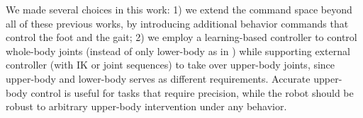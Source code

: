 We made several choices in this work: 1) we extend the command space beyond all of these previous works, by introducing additional behavior commands that control the foot and the gait; 2) we employ a learning-based controller to control whole-body joints (instead of only lower-body as in \citeauthor{lu2024pmp}) while supporting external controller (with IK or joint sequences) to take over upper-body joints, since upper-body and lower-body serves as different requirements. Accurate upper-body control is useful for tasks that require precision, while the robot should be robust to arbitrary upper-body intervention under any behavior.
